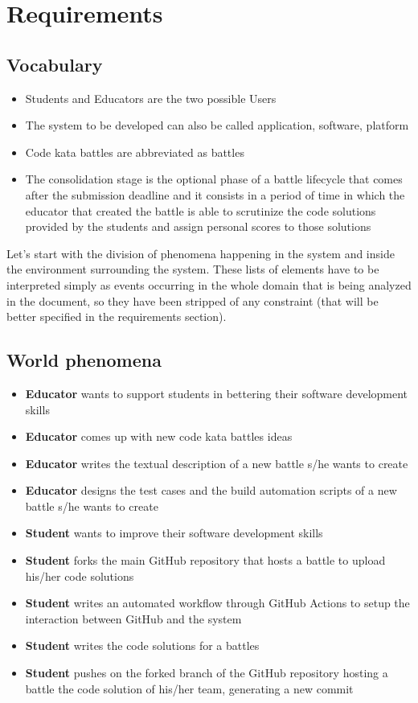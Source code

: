 \section{Requirements}
	
	\subsection{Vocabulary}
	\begin{itemize}
		\item Students and Educators are the two possible Users
		\item The system to be developed can also be called application, software, platform
		\item Code kata battles are abbreviated as battles
		\item The consolidation stage is the optional phase of a battle lifecycle that comes after the submission deadline and it consists in a period of time in which the educator that created the battle is able to scrutinize the code solutions provided by the students and assign personal scores to those solutions
	\end{itemize}
	
	
	Let's start with the division of phenomena happening in the system and inside the environment surrounding the system. These lists of elements have to be interpreted simply as events occurring in the whole domain that is being analyzed in the document, so they have been stripped of any constraint (that will be better specified in the requirements section).
	
	
	
	\subsection{World phenomena}
	
	\begin{itemize}
		\item \textbf{Educator} wants to support students in bettering their software development skills
		\item \textbf{Educator} comes up with new code kata battles ideas
		\item \textbf{Educator} writes the textual description of a new battle s/he wants to create
		\item \textbf{Educator} designs the test cases and the build automation scripts of a new battle s/he wants to create
		\item \textbf{Student} wants to improve their software development skills
		\item \textbf{Student} forks the main GitHub repository that hosts a battle to upload his/her code solutions
		\item \textbf{Student} writes an automated workflow through GitHub Actions to setup the interaction between GitHub and the system
		\item \textbf{Student} writes the code solutions for a battles
		\item \textbf{Student} pushes on the forked branch of the GitHub repository hosting a battle the  code solution of his/her team, generating a new commit


	\end{itemize}
	
